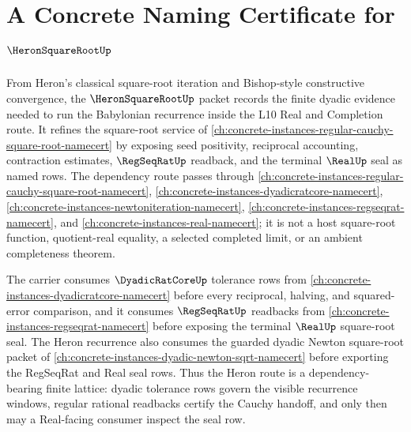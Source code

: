 \chapter{A Concrete Naming Certificate for $\HeronSquareRootUp$}
\label{ch:concrete-instances-heron-square-root-namecert}

From Heron's classical square-root iteration and Bishop-style constructive convergence, the $\HeronSquareRootUp$ packet records the finite dyadic evidence needed to run the Babylonian recurrence inside the L10 Real and Completion route. It refines the square-root service of \autoref{ch:concrete-instances-regular-cauchy-square-root-namecert} by exposing seed positivity, reciprocal accounting, contraction estimates, $\RegSeqRatUp$ readback, and the terminal $\RealUp$ seal as named rows. The dependency route passes through \autoref{ch:concrete-instances-regular-cauchy-square-root-namecert}, \autoref{ch:concrete-instances-dyadicratcore-namecert}, \autoref{ch:concrete-instances-newtoniteration-namecert}, \autoref{ch:concrete-instances-regseqrat-namecert}, and \autoref{ch:concrete-instances-real-namecert}; it is not a host square-root function, quotient-real equality, a selected completed limit, or an ambient completeness theorem.

The carrier consumes $\DyadicRatCoreUp$ tolerance rows from \autoref{ch:concrete-instances-dyadicratcore-namecert} before every reciprocal, halving, and squared-error comparison, and it consumes $\RegSeqRatUp$ readbacks from \autoref{ch:concrete-instances-regseqrat-namecert} before exposing the terminal $\RealUp$ square-root seal. The Heron recurrence also consumes the guarded dyadic Newton square-root packet of \autoref{ch:concrete-instances-dyadic-newton-sqrt-namecert} before exporting the RegSeqRat and Real seal rows. Thus the Heron route is a dependency-bearing finite lattice: dyadic tolerance rows govern the visible recurrence windows, regular rational readbacks certify the Cauchy handoff, and only then may a Real-facing consumer inspect the seal row.


